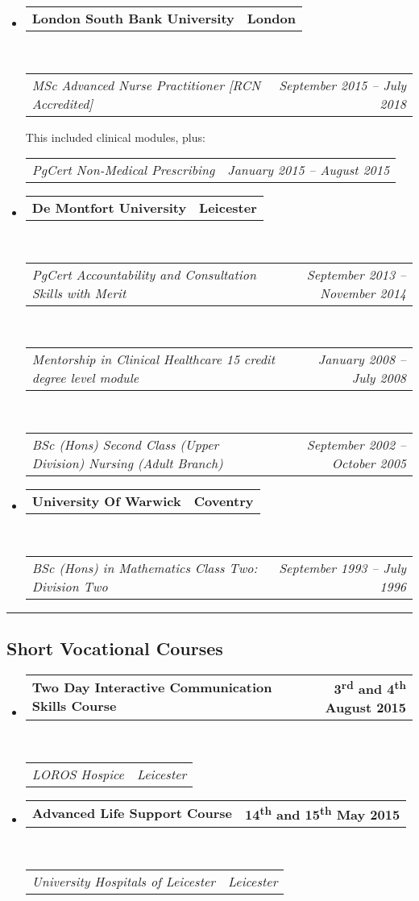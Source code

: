 \documentclass{article}
\makeatletter
\newcommand{\headerrow}[2]
{\begin{tabular*}{\linewidth}{l@{\extracolsep{\fill}}r}
	#1 &
	#2 \\
\end{tabular*}}
\makeatother
\begin{document}
\begin{itemize}
	\parskip=0.1em

	\item 
	\headerrow
		{\textbf{London South Bank University}}
		{\textbf{London}}
	\\
	\headerrow
		{\emph{MSc Advanced Nurse Practitioner [RCN Accredited]}}
		{\emph{September 2015 -- July 2018}}
	This included clinical modules, plus:
	\headerrow
		{\emph{PgCert Non-Medical Prescribing}}
		{\emph{January 2015 -- August 2015}}
	\item 
	\headerrow
		{\textbf{De Montfort University}}
		{\textbf{Leicester}}
	\\
	\headerrow
		{\emph{PgCert Accountability and Consultation Skills with Merit}}
		{\emph{September 2013 -- November 2014}}
	\\
	\headerrow
		{\emph{Mentorship in Clinical Healthcare 15 credit degree level module}}
		{\emph{January 2008 -- July 2008}}
	\\
	\headerrow
		{\emph{BSc (Hons) Second Class (Upper Division) Nursing (Adult Branch)}}
		{\emph{September 2002 -- October 2005}}
	\item 
	\headerrow
		{\textbf{University Of Warwick}}
		{\textbf{Coventry}}
	\\
	\headerrow
		{\emph{BSc (Hons) in Mathematics Class Two: Division Two}}
		{\emph{September 1993 -- July 1996}}
	
\end{itemize}


\hrule
\vspace{-0.4em}
\subsection*{Short Vocational Courses}

\begin{itemize}
	\item
	\headerrow
		{\textbf{Two Day Interactive Communication Skills Course}}
		{\textbf{3\textsuperscript{rd} and 4\textsuperscript{th} August 2015}}
	\\
	\headerrow
		{\emph{LOROS Hospice}}
		{\emph{Leicester}}
	\item
	\headerrow
		{\textbf{Advanced Life Support Course}}
		{\textbf{14\textsuperscript{th} and 15\textsuperscript{th} May 2015}}
	\\
	\headerrow
		{\emph{University Hospitals of Leicester}}
		{\emph{Leicester}}
\end{itemize}
\end{document}
